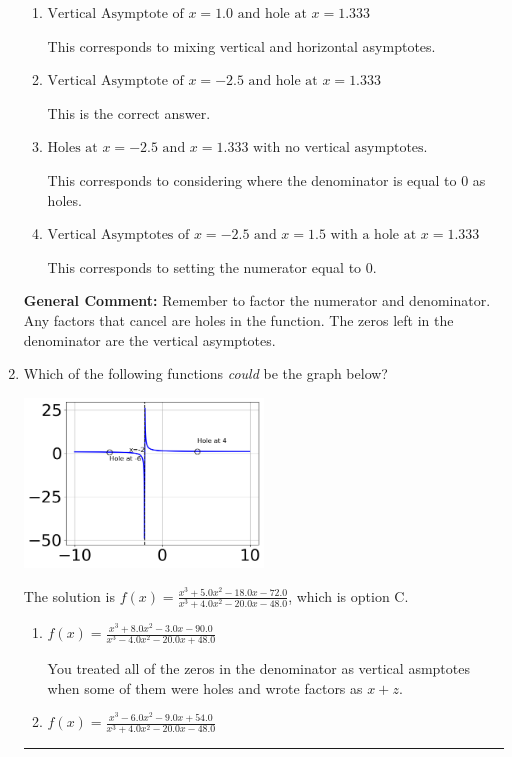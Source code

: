 \documentclass{extbook}[14pt]
\newcommand{\litem}[1]{\item #1

\rule{\textwidth}{0.4pt}}
\begin{document}
\begin{enumerate}
{\begin{enumerate}[label=\Alph*.]
This corresponds to not factoring out the hole.
\item \( \text{Vertical Asymptote of } x = 1.0 \text{ and hole at } x = 1.333 \)

This corresponds to mixing vertical and horizontal asymptotes.
\item \( \text{Vertical Asymptote of } x = -2.5 \text{ and hole at } x = 1.333 \)

This is the correct answer.
\item \( \text{Holes at } x = -2.5 \text{ and } x = 1.333 \text{ with no vertical asymptotes.} \)

This corresponds to considering where the denominator is equal to 0 as holes.
\item \( \text{Vertical Asymptotes of } x = -2.5 \text{ and } x = 1.5 \text{ with a hole at } x = 1.333 \)

This corresponds to setting the numerator equal to 0.
\end{enumerate}

\textbf{General Comment:} Remember to factor the numerator and denominator. Any factors that cancel are holes in the function. The zeros left in the denominator are the vertical asymptotes.
}
\litem{
Which of the following functions \textit{could} be the graph below?

\begin{center}
    \includegraphics[width=0.5\textwidth]{../Figures/identifyGraphOfRationalFunctionCopyB.png}
\end{center}


The solution is \( f(x)=\frac{x^{3} +5.0 x^{2} -18.0 x -72.0}{x^{3} +4.0 x^{2} -20.0 x -48.0} \), which is option C.\begin{enumerate}[label=\Alph*.]
\item \( f(x)=\frac{x^{3} +8.0 x^{2} -3.0 x -90.0}{x^{3} -4.0 x^{2} -20.0 x + 48.0} \)

You treated all of the zeros in the denominator as vertical asmptotes when some of them were holes and wrote factors as $x+z$.
\item \( f(x)=\frac{x^{3} -6.0 x^{2} -9.0 x + 54.0}{x^{3} +4.0 x^{2} -20.0 x -48.0} \)


\end{enumerate}}
\end{enumerate}
\end{document}
